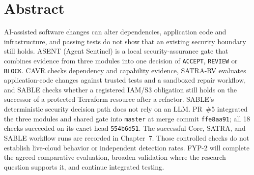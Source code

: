 \chapter*{Abstract}
AI-assisted software changes can alter dependencies, application code and infrastructure, and passing tests do not show that an existing security boundary still holds. ASENT (Agent Sentinel) is a local security-assurance gate that combines evidence from three modules into one decision of \texttt{ACCEPT}, \texttt{REVIEW} or \texttt{BLOCK}. CAVR checks dependency and capability evidence, SATRA-RV evaluates application-code changes against trusted tests and a sandboxed repair workflow, and SABLE checks whether a registered IAM/S3 obligation still holds on the successor of a protected Terraform resource after a refactor. SABLE's deterministic security decision path does not rely on an LLM. PR~\#5 integrated the three modules and shared gate into \texttt{master} at merge commit \texttt{ffe8aa91}; all 18 checks succeeded on its exact head \texttt{554b6d51}. The successful Core, SATRA, and SABLE workflow runs are recorded in Chapter~7. Those controlled checks do not establish live-cloud behavior or independent detection rates. FYP-2 will complete the agreed comparative evaluation, broaden validation where the research question supports it, and continue integrated testing.
